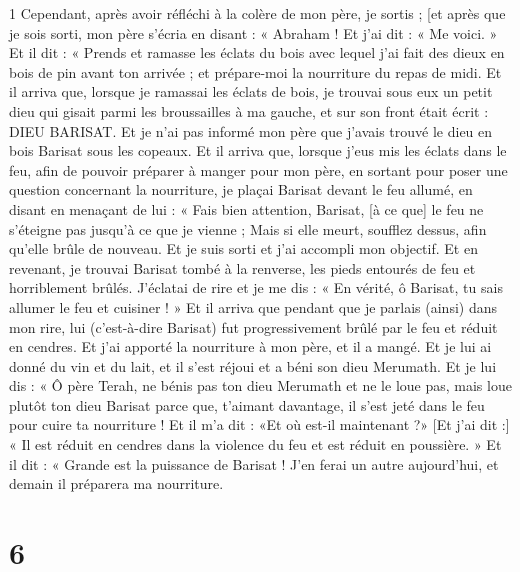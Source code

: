 \par 1 Cependant, après avoir réfléchi à la colère de mon père, je sortis ; [et après que je sois sorti, mon père s'écria en disant : « Abraham ! Et j’ai dit : « Me voici. » Et il dit : « Prends et ramasse les éclats du bois avec lequel j'ai fait des dieux en bois de pin avant ton arrivée ; et prépare-moi la nourriture du repas de midi. Et il arriva que, lorsque je ramassai les éclats de bois, je trouvai sous eux un petit dieu qui gisait parmi les broussailles à ma gauche, et sur son front était écrit : DIEU BARISAT. Et je n'ai pas informé mon père que j'avais trouvé le dieu en bois Barisat sous les copeaux. Et il arriva que, lorsque j'eus mis les éclats dans le feu, afin de pouvoir préparer à manger pour mon père, en sortant pour poser une question concernant la nourriture, je plaçai Barisat devant le feu allumé, en disant en menaçant de lui : « Fais bien attention, Barisat, [à ce que] le feu ne s'éteigne pas jusqu'à ce que je vienne ; Mais si elle meurt, soufflez dessus, afin qu'elle brûle de nouveau. Et je suis sorti et j’ai accompli mon objectif. Et en revenant, je trouvai Barisat tombé à la renverse, les pieds entourés de feu et horriblement brûlés. J’éclatai de rire et je me dis : « En vérité, ô Barisat, tu sais allumer le feu et cuisiner ! » Et il arriva que pendant que je parlais (ainsi) dans mon rire, lui (c'est-à-dire Barisat) fut progressivement brûlé par le feu et réduit en cendres. Et j'ai apporté la nourriture à mon père, et il a mangé. Et je lui ai donné du vin et du lait, et il s'est réjoui et a béni son dieu Merumath. Et je lui dis : « Ô père Terah, ne bénis pas ton dieu Merumath et ne le loue pas, mais loue plutôt ton dieu Barisat parce que, t'aimant davantage, il s'est jeté dans le feu pour cuire ta nourriture ! Et il m'a dit : «Et où est-il maintenant ?» [Et j’ai dit :] « Il est réduit en cendres dans la violence du feu et est réduit en poussière. » Et il dit : « Grande est la puissance de Barisat ! J'en ferai un autre aujourd'hui, et demain il préparera ma nourriture.

\chapter{6}

